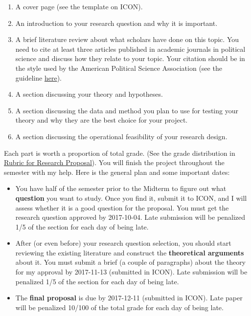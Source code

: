 \documentclass[11pt,]{article}
\providecommand{\tightlist}{%
  \setlength{\itemsep}{0pt}\setlength{\parskip}{0pt}}
\theoremstyle{definition}
\theoremstyle{definition}
\theoremstyle{remark}
\begin{document}
\begin{enumerate}
\def\labelenumi{\arabic{enumi}.}
\tightlist
\item
  A cover page (see the template on ICON).
\item
  An introduction to your research question and why it is important.
\item
  A brief literature review about what scholars have done on this topic.
  You need to cite at least three articles published in academic
  journals in political science and discuss how they relate to your
  topic. Your citation should be in the style used by the American
  Political Science Association (see the guideline
  \href{http://www.apsanet.org/portals/54/Files/Publications/APSAStyleManual2006.pdf}{here}).
\item
  A section discussing your theory and hypotheses.
\item
  A section discussing the data and method you plan to use for testing
  your theory and why they are the best choice for your project.
\item
  A section discussing the operational feasibility of your research
  design.
\end{enumerate}

Each part is worth a proportion of total grade. (See the grade
distribution in \protect\hyperlink{id}{Rubric for Research Proposal}).
You will finish the project throughout the semester with my help. Here
is the general plan and some important dates:

\begin{itemize}
\tightlist
\item
  You have half of the semester prior to the Midterm to figure out what
  \textbf{question} you want to study. Once you find it, submit it to
  ICON, and I will assess whether it is a good question for the
  proposal. You must get the research question approved by 2017-10-04.
  Late submission will be penalized 1/5 of the section for each day of
  being late.
\item
  After (or even before) your research question selection, you should
  start reviewing the existing literature and construct the
  \textbf{theoretical arguments} about it. You must submit a brief (a
  couple of paragraphs) about the theory for my approval by 2017-11-13
  (submitted in ICON). Late submission will be penalized 1/5 of the
  section for each day of being late.
\item
  The \textbf{final proposal} is due by 2017-12-11 (submitted in ICON).
  Late paper will be penalized 10/100 of the total grade for each day of
  being late.
\end{itemize}
\end{document}
